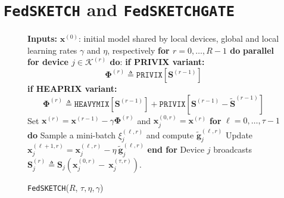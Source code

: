 \documentclass{article} %
\newcommand\DrawBoxhom[3][]{%
  \begin{tikzpicture}[remember picture,overlay]
    \draw[overlay,fill=gray!30,#1] 
    ([xshift=-0.5em,yshift=-0.1ex]{pic cs:#2}) 
    rectangle 
    ([xshift=35pt,yshift=3.1ex]pic cs:#3);
  \end{tikzpicture}%
}
\newcommand\DrawBoxxhom[3][]{%
  \begin{tikzpicture}[remember picture,overlay]
    \draw[overlay,fill=gray!30,#1] 
    ([xshift=-5.9em,yshift=-1.1ex]{pic cs:#2}) 
    rectangle 
    ([xshift=80pt,yshift=-1.5ex]pic cs:#3);
  \end{tikzpicture}%
}
\begin{document}
\vspace{-0.05in}
\section{\texttt{FedSKETCH} and \texttt{FedSKETCHGATE}}\label{sec:algos}
\vspace{-0.05in}

\begin{figure}\vspace{-0.4in}
\begin{minipage}{\linewidth}
\begin{algorithm}[H]
\caption{\texttt{FedSKETCH}($R$, $\tau, \eta, \gamma$) }\label{Alg:PFLHom}
\begin{algorithmic}[1]
\STATE \textbf{Inputs:} $\boldsymbol{x}^{(0)}$: initial  model shared by local devices, global and local learning rates $\gamma$ and $\eta$, respectively
\STATE \textbf{for $r=0, \ldots, R-1$ do}
\STATE \textbf{parallel for device $j\in \mathcal{K}^{(r)}$ do}:
\STATE \hspace{0.02in} \textbf{if PRIVIX variant:} 
{\small $${\mathbf{\Phi}}^{(r)}\triangleq  {\texttt{PRIVIX}}\left[{\mathbf{S}}^{(r-1)}\right]$$}
\STATE \hspace{0.02in} \textbf{if HEAPRIX variant:} \label{line:heaprix1}
{\small $${\mathbf{\Phi}}^{(r)}\triangleq \texttt{HEAVYMIX}\left[{\mathbf{S}}^{(r-1)}\right]+\texttt{PRIVIX}\left[{\mathbf{S}}^{(r-1)}- \tilde{\mathbf{S}}^{(r-1)}\right]$$}
\STATE Set $\boldsymbol{x}^{(r)}=\boldsymbol{x}^{(r-1)}-\gamma{\mathbf{\Phi}}^{(r)}$ and $\boldsymbol{x}_j^{(0,r)}=\boldsymbol{x}^{(r)}$ 
\STATE \hspace{0.01in} \textbf{for} $\ell=0,\ldots,\tau-1$ \textbf{do}
\STATE \hspace{0.03in} Sample a mini-batch $\xi_j^{(\ell,r)}$ and compute $\tilde{\mathbf{g}}_{j}^{(\ell,r)}$
\STATE Update $\boldsymbol{x}^{(\ell+1,r)}_{j}=\boldsymbol{x}^{(\ell,r)}_j-\eta~ \tilde{\mathbf{g}}_{j}^{(\ell,r)}$ \label{eq:update-rule-alg}
\STATE \hspace{0.05in}\textbf{end for}
\STATE Device $j$ broadcasts $\mathbf{S}^{(r)}_{j}\triangleq\mathbf{S}_{j}\left(\boldsymbol{x}_j^{(0,r)}-~{\boldsymbol{x}}_{j}^{(\tau,r)}\right)$.

\end{algorithmic}
\end{algorithm}
\end{minipage}
\end{figure}
\end{document}
